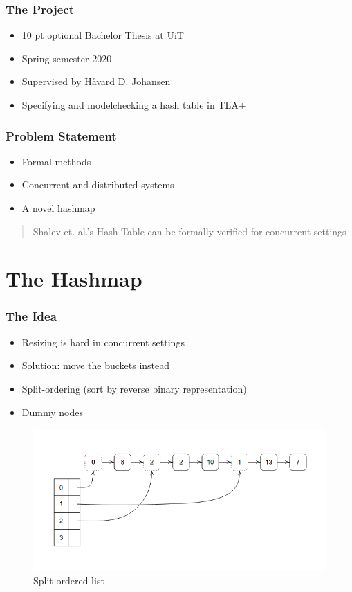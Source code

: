 \documentclass{beamer}
\begin{document}

\begin{frame}
  \frametitle{The Project}
  \begin{itemize}
  \item 10 pt optional Bachelor Thesis at UiT
  \item Spring semester 2020
  \item Supervised by Håvard D. Johansen
  \item Specifying and modelchecking a hash table in TLA+
  \end{itemize}
\end{frame}

\begin{frame}
  \frametitle{Problem Statement}
  \begin{itemize}
  \item Formal methods
  \item Concurrent and distributed systems
  \item A novel hashmap~\cite{Shalev2006}
  \end{itemize}
  \vfill{}
  \begin{quotation}
    Shalev et. al.'s Hash Table can be formally verified for concurrent settings
  \end{quotation}
\end{frame}

\section{The Hashmap}


\begin{frame}
  \frametitle{The Idea}
  \begin{itemize}
  \item Resizing is hard in concurrent settings
  \item Solution: move the buckets instead
  \item Split-ordering (sort by reverse binary representation)
  \item Dummy nodes
  \end{itemize}

  \begin{figure}
    \centering
    \includegraphics[width=\textwidth]{figures/split-ordered-list-diagram}
    \caption{Split-ordered list}
    \label{fig:SOlist}
  \end{figure}
\end{frame}
\end{document}
